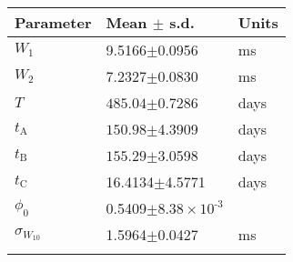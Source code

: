 \begin{tabular}{lll} \hhline{===}
        Parameter & Mean $\pm$ s.d. &  Units\\ \hline
$W_{1}$ & 9.5166$\pm$0.0956 & ms\\
$W_{2}$ & 7.2327$\pm$0.0830 & ms\\
$T$ & $485.04$$\pm$0.7286 & days\\
$t_\mathrm{A}$ & $150.98$$\pm$4.3909 & days\\
$t_\mathrm{B}$ & $155.29$$\pm$3.0598 & days\\
$t_\mathrm{C}$ & 16.4134$\pm$4.5771 & days\\
$\phi_{0}$ & 0.5409$\pm$${8.38}\times 10^{\textrm{-}3}$ & \\
$\sigma_{W_{10}}$ & 1.5964$\pm$0.0427 & ms\\
\hhline{===}
\end{tabular}